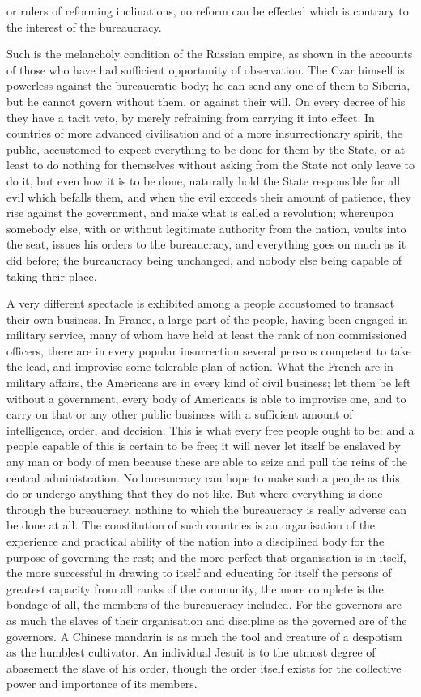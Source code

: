 \documentclass[11pt,openany]{book}
\begin{document}
or rulers of reforming inclinations, no reform can be effected which is contrary to the interest of the bureaucracy.

Such is the melancholy condition of the Russian empire, as shown in the accounts of those who have had sufficient opportunity of observation. The Czar himself is powerless against the bureaucratic body; he can send any one of them to Siberia, but he cannot govern without them, or against their will. On every decree of his they have a tacit veto, by merely refraining from carrying it into effect. In countries of more advanced civilisation and of a more insurrectionary spirit, the public, accustomed to expect everything to be done for them by the State, or at least to do nothing for themselves without asking from the State not only leave to do it, but even how it is to be done, naturally hold the State responsible for all evil which befalls them, and when the evil exceeds their amount of patience, they rise against the government, and make what is called a revolution; whereupon somebody else, with or without legitimate authority from the nation, vaults into the seat, issues his orders to the bureaucracy, and everything goes on much as it did before; the bureaucracy being unchanged, and nobody else being capable of taking their place.

A very different spectacle is exhibited among a people accustomed to transact their own business. In France, a large part of the people, having been engaged in military service, many of whom have held at least the rank of non commissioned officers, there are in every popular insurrection several persons competent to take the lead, and improvise some tolerable plan of action. What the French are in military affairs, the Americans are in every kind of civil business; let them be left without a government, every body of Americans is able to improvise one, and to carry on that or any other public business with a sufficient amount of intelligence, order, and decision. This is what every free people ought to be: and a people capable of this is certain to be free; it will never let itself be enslaved by any man or body of men because these are able to seize and pull the reins of the central administration. No bureaucracy can hope to make such a people as this do or undergo anything that they do not like. But where everything is done through the bureaucracy, nothing to which the bureaucracy is really adverse can be done at all. The constitution of such countries is an organisation of the experience and practical ability of the nation into a disciplined body for the purpose of governing the rest; and the more perfect that organisation is in itself, the more successful in drawing to itself and educating for itself the persons of greatest capacity from all ranks of the community, the more complete is the bondage of all, the members of the bureaucracy included. For the governors are as much the slaves of their organisation and discipline as the governed are of the governors. A Chinese mandarin is as much the tool and creature of a despotism as the humblest cultivator. An individual Jesuit is to the utmost degree of abasement the slave of his order, though the order itself exists for the collective power and importance of its members.
\end{document}
